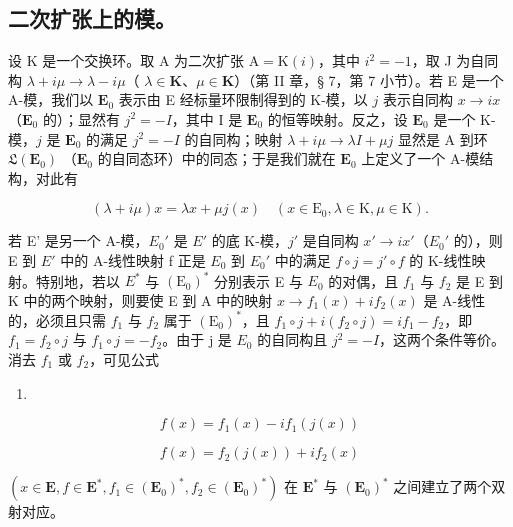 \subsection{二次扩张上的模。}

设 K 是一个交换环。取 A 为二次扩张 \(\mathrm{A} = \mathrm{K}(i)\)，其中 \(i^{2} = -1\)，取 J 为自同构 \(\lambda + i\mu \to \lambda - i\mu\)（ \(\lambda \in \mathbf{K}\)、\(\mu \in \mathbf{K}\)）（第 II 章，§ 7，第 7 小节）。若 E 是一个 A-模，我们以 \(\mathbf{E}_0\) 表示由 E 经标量环限制得到的 K-模，以 \(j\) 表示自同构 \(x \to ix\)（\(\mathbf{E}_0\) 的）；显然有 \(j^2 = -I\)，其中 I 是 \(\mathbf{E}_0\) 的恒等映射。反之，设 \(\mathbf{E}_0\) 是一个 K-模，\(j\) 是 \(\mathbf{E}_0\) 的满足 \(j^2 = -I\) 的自同构；映射 \(\lambda + i\mu \to \lambda I + \mu j\) 显然是 A 到环 \(\mathfrak{L}(\mathbf{E}_0)\) （\(\mathbf{E}_0\) 的自同态环）中的同态；于是我们就在 \(\mathbf{E}_0\) 上定义了一个 A-模结构，对此有

\[
(\lambda + i \mu) x = \lambda x + \mu j (x) \quad (x \in \mathrm{E} _ {0}, \lambda \in \mathrm{K}, \mu \in \mathrm{K}).\tag{2}
\]

若 E' 是另一个 A-模，\(E_{0}'\) 是 \(E'\) 的底 K-模，\(j'\) 是自同构 \(x' \rightarrow ix'\)（\(E_{0}'\) 的），则 E 到 \(E'\) 中的 A-线性映射 f 正是 \(E_{0}\) 到 \(E_{0}'\) 中的满足 \(f \circ j = j' \circ f\) 的 K-线性映射。特别地，若以 \(E^{*}\) 与 \((\mathrm{E}_{0})^{*}\) 分别表示 E 与 \(E_{0}\) 的对偶，且 \(f_{1}\) 与 \(f_{2}\) 是 E 到 K 中的两个映射，则要使 E 到 A 中的映射 \(x \to f_{1}(x) + if_{2}(x)\) 是 A-线性的，必须且只需 \(f_{1}\) 与 \(f_{2}\) 属于 \((\mathrm{E}_{0})^{*}\)，且 \(f_{1} \circ j + i(f_{2} \circ j) = if_{1} - f_{2}\)，即 \(f_{1} = f_{2} \circ j\) 与 \(f_{1} \circ j = -f_{2}\)。由于 j 是 \(E_{0}\) 的自同构且 \(j^{2} = -I\)，这两个条件等价。消去 \(f_{1}\) 或 \(f_{2}\)，可见公式

\begin{enumerate}
\def\labelenumi{(\arabic{enumi})}
\setcounter{enumi}{2}
\tightlist
\item
\end{enumerate}

\[
f (x) = f _ {1} (x) - i f _ {1} (j (x))\tag{4}
\]

\[
f (x) = f _ {2} (j (x)) + i f _ {2} (x)
\]

\((x \in \mathbf{E}, f \in \mathbf{E}^{*}, f_{1} \in (\mathbf{E}_{0})^{*}, f_{2} \in (\mathbf{E}_{0})^{*})\) 在 \(\mathbf{E}^{*}\) 与 \((\mathbf{E}_{0})^{*}\) 之间建立了两个双射对应。

